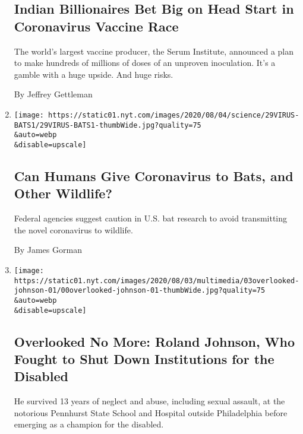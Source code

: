 \begin{enumerate}
{  \subsection{Indian Billionaires Bet Big on Head Start in Coronavirus
  Vaccine
  Race}\label{indian-billionaires-bet-big-on-head-start-in-coronavirus-vaccine-race}}

  The world's largest vaccine producer, the Serum Institute, announced a
  plan to make hundreds of millions of doses of an unproven inoculation.
  It's a gamble with a huge upside. And huge risks.

  By Jeffrey Gettleman
\item
  \href{/2020/08/01/science/Covid-bats.html}{}

  \texttt{[image: https://static01.nyt.com/images/2020/08/04/science/29VIRUS-BATS1/29VIRUS-BATS1-thumbWide.jpg?quality=75\\\&auto=webp\\\&disable=upscale]}

  \hypertarget{can-humans-give-coronavirus-to-bats-and-other-wildlife}{%
  \subsection{Can Humans Give Coronavirus to Bats, and Other
  Wildlife?}\label{can-humans-give-coronavirus-to-bats-and-other-wildlife}}

  Federal agencies suggest caution in U.S. bat research to avoid
  transmitting the novel coronavirus to wildlife.

  By James Gorman
\item
  \href{/2020/07/31/obituaries/roland-johnson-overlooked.html}{}

  \texttt{[image: https://static01.nyt.com/images/2020/08/03/multimedia/03overlooked-johnson-01/00overlooked-johnson-01-thumbWide.jpg?quality=75\\\&auto=webp\\\&disable=upscale]}

  \hypertarget{overlooked-no-more-roland-johnson-who-fought-to-shut-down-institutions-for-the-disabled}{%
  \subsection{Overlooked No More: Roland Johnson, Who Fought to Shut
  Down Institutions for the
  Disabled}\label{overlooked-no-more-roland-johnson-who-fought-to-shut-down-institutions-for-the-disabled}}

  He survived 13 years of neglect and abuse, including sexual assault,
  at the notorious Pennhurst State School and Hospital outside
  Philadelphia before emerging as a champion for the disabled.


\end{enumerate}
